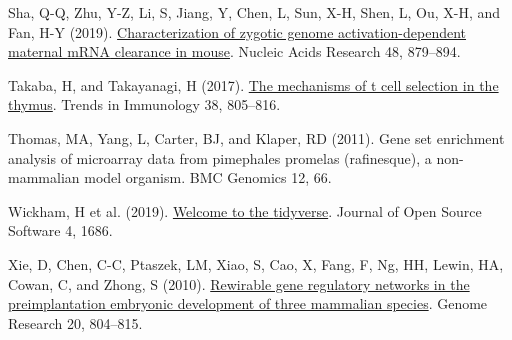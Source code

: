 \documentclass[
  parskip,
  oneside]{scrreprt}
\newlength{\cslhangindent}
\newlength{\cslentryspacingunit} %
\newenvironment{CSLReferences}[2] %
 {%
  \setlength{\parindent}{0pt}
  \ifodd #1
  \let\oldpar\par
  \def\par{\hangindent=\cslhangindent\oldpar}
  \fi
  \setlength{\parskip}{#2\cslentryspacingunit}
 }%
 {}
\begin{document}
\begin{CSLReferences}{0}{0}
\leavevmode{}%
Sha, Q-Q, Zhu, Y-Z, Li, S, Jiang, Y, Chen, L, Sun, X-H, Shen, L, Ou,
X-H, and Fan, H-Y (2019).
\href{https://doi.org/10.1093/nar/gkz1111}{Characterization of zygotic
genome activation-dependent maternal {mRNA} clearance in mouse}. Nucleic
Acids Research 48, 879--894.

\leavevmode{}%
Takaba, H, and Takayanagi, H (2017).
\href{https://doi.org/10.1016/j.it.2017.07.010}{The mechanisms of t cell
selection in the thymus}. Trends in Immunology 38, 805--816.

\leavevmode{}%
Thomas, MA, Yang, L, Carter, BJ, and Klaper, RD (2011). Gene set
enrichment analysis of microarray data from pimephales promelas
(rafinesque), a non-mammalian model organism. BMC Genomics 12, 66.

\leavevmode{}%
Wickham, H et al. (2019).
\href{https://doi.org/10.21105/joss.01686}{Welcome to the {tidyverse}}.
Journal of Open Source Software 4, 1686.

\leavevmode{}%
Xie, D, Chen, C-C, Ptaszek, LM, Xiao, S, Cao, X, Fang, F, Ng, HH, Lewin,
HA, Cowan, C, and Zhong, S (2010).
\href{https://doi.org/10.1101/gr.100594.109}{Rewirable gene regulatory
networks in the preimplantation embryonic development of three mammalian
species}. Genome Research 20, 804--815.

\end{CSLReferences}
\end{document}
